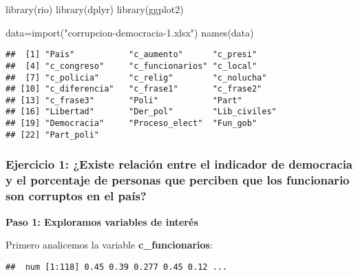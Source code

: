 \documentclass[
]{article}
\newenvironment{Shaded}{\begin{snugshade}}{\end{snugshade}}
\newcommand{\FunctionTok}[1]{\textcolor[rgb]{0.00,0.00,0.00}{#1}}
\newcommand{\NormalTok}[1]{#1}
\newcommand{\OtherTok}[1]{\textcolor[rgb]{0.56,0.35,0.01}{#1}}
\newcommand{\SpecialCharTok}[1]{\textcolor[rgb]{0.00,0.00,0.00}{#1}}
\newcommand{\StringTok}[1]{\textcolor[rgb]{0.31,0.60,0.02}{#1}}
\begin{document}
\begin{Shaded}
\begin{Highlighting}[]
\FunctionTok{library}\NormalTok{(rio)}
\FunctionTok{library}\NormalTok{(dplyr)}
\FunctionTok{library}\NormalTok{(ggplot2)}

\NormalTok{data}\OtherTok{=}\FunctionTok{import}\NormalTok{(}\StringTok{"corrupcion{-}democracia{-}1.xlsx"}\NormalTok{)}
\FunctionTok{names}\NormalTok{(data)}
\end{Highlighting}
\end{Shaded}

\begin{verbatim}
##  [1] "Pais"           "c_aumento"      "c_presi"       
##  [4] "c_congreso"     "c_funcionarios" "c_local"       
##  [7] "c_policia"      "c_relig"        "c_nolucha"     
## [10] "c_diferencia"   "c_frase1"       "c_frase2"      
## [13] "c_frase3"       "Poli"           "Part"          
## [16] "Libertad"       "Der_pol"        "Lib_civiles"   
## [19] "Democracia"     "Proceso_elect"  "Fun_gob"       
## [22] "Part_poli"
\end{verbatim}

\hypertarget{ejercicio-1-existe-relaciuxf3n-entre-el-indicador-de-democracia-y-el-porcentaje-de-personas-que-perciben-que-los-funcionario-son-corruptos-en-el-pauxeds}{%
\subsubsection{Ejercicio 1: ¿Existe relación entre el indicador de
democracia y el porcentaje de personas que perciben que los funcionario
son corruptos en el
país?}\label{ejercicio-1-existe-relaciuxf3n-entre-el-indicador-de-democracia-y-el-porcentaje-de-personas-que-perciben-que-los-funcionario-son-corruptos-en-el-pauxeds}}

\textbf{Paso 1: Exploramos variables de interés}

Primero analicemos la variable \textbf{c\_funcionarios}:

\begin{Shaded}
\end{Shaded}

\begin{verbatim}
##  num [1:118] 0.45 0.39 0.277 0.45 0.12 ...
\end{verbatim}
\end{document}
